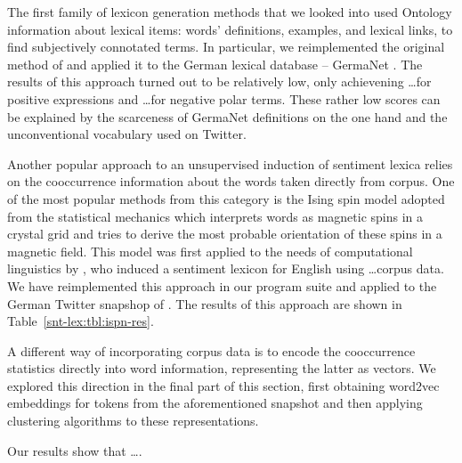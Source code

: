 The first family of lexicon generation methods that we looked into
used Ontology information about lexical items: words' definitions,
examples, and lexical links, to find subjectively connotated terms.
In particular, we reimplemented the original method of
\citet{Esuli:06b} and applied it to the German lexical database --
GermaNet \cite{Hamp:97}.  The results of this approach turned out to
be relatively low, only achievening \ldots for positive expressions
and \ldots for negative polar terms.  These rather low scores can be
explained by the scarceness of GermaNet definitions on the one hand
and the unconventional vocabulary used on Twitter.

Another popular approach to an unsupervised induction of sentiment
lexica relies on the cooccurrence information about the words taken
directly from corpus.  One of the most popular methods from this
category is the Ising spin model adopted from the statistical
mechanics which interprets words as magnetic spins in a crystal grid
and tries to derive the most probable orientation of these spins in a
magnetic field.  This model was first applied to the needs of
computational linguistics by \citet{Takamura:05}, who induced a
sentiment lexicon for English using \ldots corpus data.  We have
reimplemented this approach in our program suite and applied to the
German Twitter snapshop of \citet{Scheffler:14}.  The results of this
approach are shown in Table~\ref{snt-lex:tbl:ispn-res}.

A different way of incorporating corpus data is to encode the
cooccurrence statistics directly into word information, representing
the latter as vectors.  We explored this direction in the final part
of this section, first obtaining word2vec embeddings for tokens from
the aforementioned snapshot and then applying clustering algorithms to
these representations.

Our results show that \ldots.

\newpage
